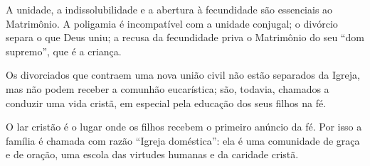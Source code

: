 A unidade, a indissolubilidade e a abertura à fecundidade são essenciais ao Matrimônio. A poligamia é incompatível com a unidade conjugal; o divórcio separa o que Deus uniu; a recusa da fecundidade priva o Matrimônio do seu ``dom supremo'', que é a criança.

Os divorciados que contraem uma nova união civil não estão separados da Igreja, mas não podem receber a comunhão eucarística; são, todavia, chamados a conduzir uma vida cristã, em especial pela educação dos seus filhos na fé.

O lar cristão é o lugar onde os filhos recebem o primeiro anúncio da fé. Por isso a família é chamada com razão ``Igreja doméstica'': ela é uma comunidade de graça e de oração, uma escola das virtudes humanas e da caridade cristã.
